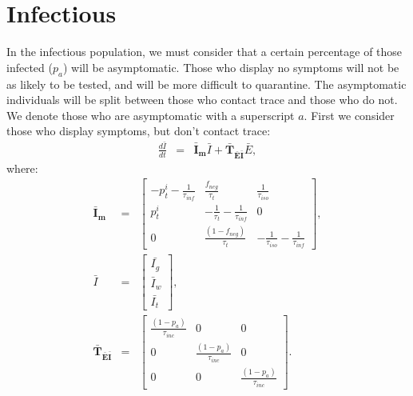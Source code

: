 \documentclass[notitlepage, superscriptaddress]{revtex4-2}
\begin{document}


\section{Infectious}
In the infectious population, we must consider that a certain percentage of those infected ($p_{a}$) will be asymptomatic. Those who display no symptoms will not be as likely to be tested, and will be more difficult to quarantine. The asymptomatic individuals will be split between those who contact trace and those who do not. We denote those who are asymptomatic with a superscript $a$. First we consider those who display symptoms, but don't contact trace:
\begin{eqnarray}
\frac{d\bar{I}}{dt} &=& \boldsymbol{\bar{I}_{m}}  \bar{I} + \boldsymbol{\bar{T}_{\bar{E}\bar{I}}}  \bar{E}, 
\end{eqnarray}
where:
%
\begin{eqnarray}
\boldsymbol{\bar{I}_{m}} &=&
\begin{bmatrix}
- p^{i}_{t} -\frac{1}{\tau_{inf}}  &  \frac{f_{neg}}{\tau_{t}}            & \frac{1}{\tau_{iso}} \\ 
 p^{i}_{t}              & -\frac{1}{\tau_{t}} -\frac{1}{\tau_{inf}}       & 0  \\ 
 0                  & \frac{(1- f_{neg})}{\tau_{t}}                        & -\frac{1}{\tau_{iso}} -\frac{1}{\tau_{inf}}
\end{bmatrix}, \\ 
%
\bar{I} &=& 
\begin{bmatrix}
\bar{I_{g}} \\ \bar{I}_{w}\\ \bar{I_{t}}
\end{bmatrix}, \\ 
%
\boldsymbol{\bar{T}_{\bar{E}\bar{I}}} &=&
\begin{bmatrix}
\frac{(1-p_{a})}{\tau_{inc}}  & 0                 & 0 \\ 
 0          &  \frac{(1-p_{a})}{\tau_{inc}}  & 0 \\ 
 0          & 0                 &  \frac{(1-p_{a})}{\tau_{inc}} 
\end{bmatrix}.
%
\end{eqnarray}
\end{document}
